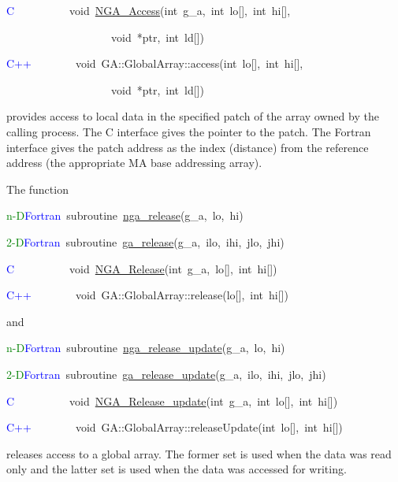 \textcolor{blue}{C}~~~~~~~~~~void~\href{https://hpc.pnl.gov/globalarrays/api/c_op_api.html\#ga_access}{NGA\_{}Access}(int~g\_a,~int~lo{[}{]},~int~hi{[}{]},

~~~~~~~~~~~~~~~~~~~void~{*}ptr,~int~ld{[}{]})~

\textcolor{blue}{C++~}~~~~~~~void~GA::GlobalArray::access(int~lo{[}{]},~int~hi{[}{]},~

~~~~~~~~~~~~~~~~~~~void~{*}ptr,~int~ld{[}{]})

provides access to local data in the specified patch of the array
owned by the calling process. The C interface gives the pointer to
the patch. The Fortran interface gives the patch address as the index
(distance) from the reference address (the appropriate MA base addressing
array).

The function

\textcolor{green}{n-D}\textcolor{blue}{Fortran}~subroutine~\href{https://hpc.pnl.gov/globalarrays/api/f_op_api.html\#ga_release}{nga\_{}release}(g\_a,~lo,~hi)~

\textcolor{green}{2-D}\textcolor{blue}{Fortran~}subroutine~\href{https://hpc.pnl.gov/globalarrays/api/f_op_api.html\#ga_release}{ga\_{}release}(g\_a,~ilo,~ihi,~jlo,~jhi)~

\textcolor{blue}{C}~~~~~~~~~~void~\href{https://hpc.pnl.gov/globalarrays/api/c_op_api.html\#ga_release}{NGA\_{}Release}(int~g\_a,~lo{[}{]},~int~hi{[}{]})

\textcolor{blue}{C++~}~~~~~~~void~GA::GlobalArray::release(lo{[}{]},~int~hi{[}{]})

and

\textcolor{green}{n-D}\textcolor{blue}{Fortran}~subroutine~\href{https://hpc.pnl.gov/globalarrays/api/f_op_api.html\#ga_release_update}{nga\_{}release\_{}update}(g\_a,~lo,~hi)~

\textcolor{green}{2-D}\textcolor{blue}{Fortran}~subroutine~\href{https://hpc.pnl.gov/globalarrays/api/f_op_api.html\#ga_release_update}{ga\_{}release\_{}update}(g\_a,~ilo,~ihi,~jlo,~jhi)

\textcolor{blue}{C}~~~~~~~~~~void~\href{https://hpc.pnl.gov/globalarrays/api/c_op_api.html\#ga_release_update}{NGA\_{}Release\_{}update}(int~g\_a,~int~lo{[}{]},~int~hi{[}{]})~

\textcolor{blue}{C++~}~~~~~~~void~GA::GlobalArray::releaseUpdate(int~lo{[}{]},~int~hi{[}{]})

releases access to a global array. The former set is used when the
data was read only and the latter set is used when the data was accessed
for writing.

